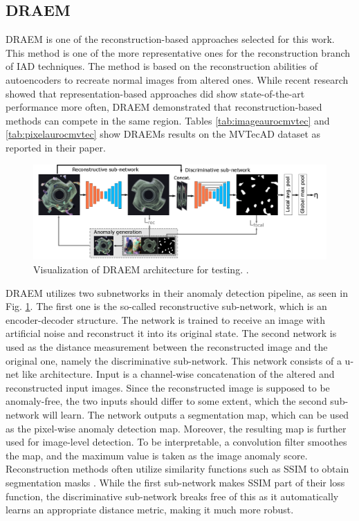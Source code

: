 \subsection{DRAEM}
\label{subsec:DRAEM}

DRAEM \cite{Zavrtanik_2021DRAEM} is one of the reconstruction-based approaches selected for this work. This method is one of the more representative ones for the reconstruction branch of 
IAD techniques. The method is based on the reconstruction abilities of autoencoders to recreate normal images from altered ones. While recent research showed that representation-based approaches did 
show state-of-the-art performance more often, DRAEM demonstrated that reconstruction-based methods can compete in the same region. Tables \ref{tab:imageaurocmvtec} and 
\ref{tab:pixelaurocmvtec} show DRAEMs results on the MVTecAD dataset as reported 
in their paper.\newline

\begin{figure}[H]
 \centering
\includegraphics[width=\textwidth]{figures/DRAEM_pipeline.png}
 \caption{Visualization of DRAEM architecture for testing. \cite{Zavrtanik_2021DRAEM}.}
 \label{fig:draempipeline}
\end{figure}

DRAEM utilizes two subnetworks in their anomaly detection pipeline, as seen in Fig. \ref{fig:draempipeline}. The first one is the so-called reconstructive sub-network, which is an encoder-decoder structure. The network is trained 
to receive an image with artificial noise and reconstruct it into its original state. The second network is used as the distance measurement between the reconstructed image and the original one, 
namely the discriminative sub-network. This network consists of a u-net \cite{Ronneberger_2015UNET} like architecture. Input is a channel-wise concatenation of the altered and reconstructed 
input images. Since the reconstructed image is supposed to be anomaly-free, the two inputs should differ to some extent, which the second sub-network will learn. The network outputs a segmentation map, 
which can be used as the pixel-wise anomaly detection map. Moreover, the resulting map is further used for image-level detection. To be interpretable, a convolution filter smoothes the map, and the maximum value is taken as the image anomaly score. Reconstruction methods often utilize similarity functions such as SSIM \cite{Wang_2004SSIM} to obtain segmentation masks \cite{Zavrtanik_2021DRAEM} 
\cite{liu2024deep}. While the first 
sub-network makes SSIM part of their loss function, the discriminative sub-network breaks free of this as it automatically learns an appropriate distance metric, making it much more robust.

